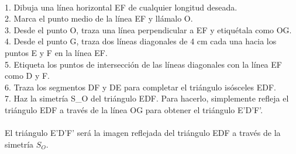 \documentclass{article}
\begin{document}
\\
1. Dibuja una línea horizontal EF de cualquier longitud deseada.\\
2. Marca el punto medio de la línea EF y llámalo O.\\
3. Desde el punto O, traza una línea perpendicular a EF y etiquétala como OG.\\
4. Desde el punto G, traza dos líneas diagonales de 4 cm cada una hacia los puntos E y F en la línea EF.\\
5. Etiqueta los puntos de intersección de las líneas diagonales con la línea EF como D y F.\\
6. Traza los segmentos DF y DE para completar el triángulo isósceles EDF.\\
7. Haz la simetría S\_O del triángulo EDF. Para hacerlo, simplemente refleja el triángulo EDF a través de la línea OG para obtener el triángulo E'D'F'.\\
\\
El triángulo E'D'F' será la imagen reflejada del triángulo EDF a través de la simetría $S_O$.\\
\end{document}
